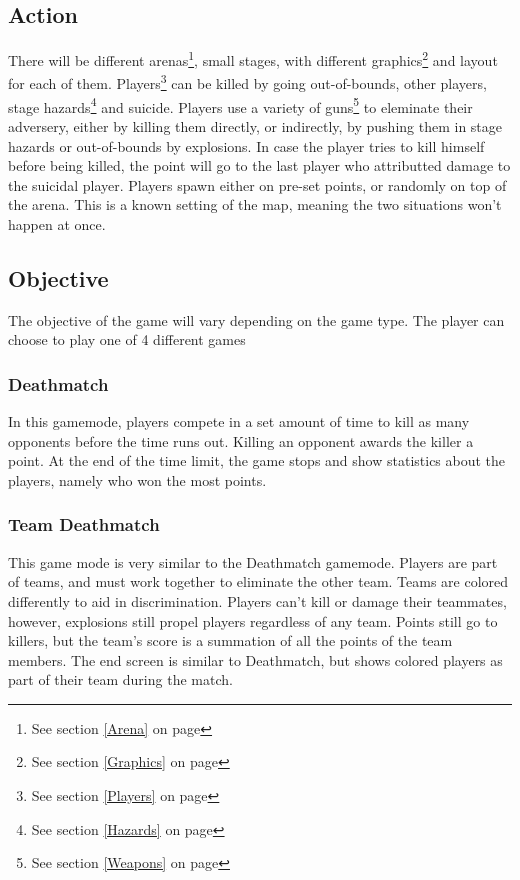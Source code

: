 \documentclass{article}
\begin{document}
\subsection{Action}
There will be different arenas\footnote{See section \ref{Arena} on page \pageref{Arena}}, small stages, with different graphics\footnote{See section \ref{Graphics} on page \pageref{Graphics}} and layout for each of them. Players\footnote{See section \ref{Players} on page \pageref{Players}} can be killed by going out-of-bounds, other players, stage hazards\footnote{See section \ref{Hazards} on page \pageref{Hazards}} and suicide. Players use a variety of guns\footnote{See section \ref{Weapons} on page \pageref{Weapons}} to eleminate their adversery, either by killing them directly, or indirectly, by pushing them in stage hazards or out-of-bounds by explosions. In case the player tries to kill himself before being killed, the point will go to the last player who attributted damage to the suicidal player. Players spawn either on pre-set points, or randomly on top of the arena. This is a known setting of the map, meaning the two situations won't happen at once.\label{Spawn}

\subsection{Objective}
The objective of the game will vary depending on the game type. The player can choose to play one of 4 different games

\subsubsection{Deathmatch}
In this gamemode, players compete in a set amount of time to kill as many opponents before the time runs out. Killing an opponent awards the killer a point. At the end of the time limit, the game stops and show statistics about the players, namely who won the most points.

\subsubsection{Team Deathmatch}
This game mode is very similar to the Deathmatch gamemode. Players are part of teams, and must work together to eliminate the other team. Teams are colored differently to aid in discrimination. Players can't kill or damage their teammates, however, explosions still propel players regardless of any team. Points still go to killers, but the team's score is a summation of all the points of the team members. The end screen is similar to Deathmatch, but shows colored players as part of their team during the match.
\end{document}
